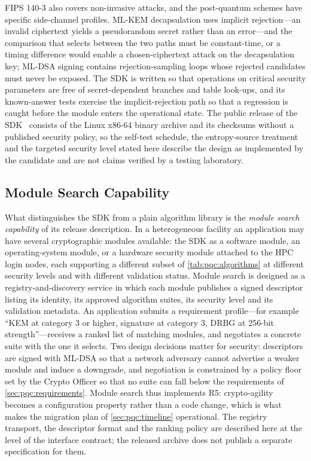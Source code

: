 FIPS 140-3 also covers non-invasive attacks, and the post-quantum schemes have specific side-channel profiles. ML-KEM decapsulation uses implicit rejection---an invalid ciphertext yields a pseudorandom secret rather than an error---and the comparison that selects between the two paths must be constant-time, or a timing difference would enable a chosen-ciphertext attack on the decapsulation key; ML-DSA signing contains rejection-sampling loops whose rejected candidates must never be exposed. The SDK is written so that operations on critical security parameters are free of secret-dependent branches and table look-ups, and its known-answer tests exercise the implicit-rejection path so that a regression is caught before the module enters the operational state. The public release of the SDK~\cite{guo2026lightriderqpc} consists of the Linux x86-64 binary archive and its checksums without a published security policy, so the self-test schedule, the entropy-source treatment and the targeted security level stated here describe the design as implemented by the candidate and are not claims verified by a testing laboratory.

\subsection{Module Search Capability}\label{sec:pqc:search}

What distinguishes the SDK from a plain algorithm library is the \emph{module search capability} of its release description. In a heterogeneous facility an application may have several cryptographic modules available: the SDK as a software module, an operating-system module, or a hardware security module attached to the HPC login nodes, each supporting a different subset of \cref{tab:pqc:algorithms} at different security levels and with different validation status. Module search is designed as a registry-and-discovery service in which each module publishes a signed descriptor listing its identity, its approved algorithm suites, its security level and its validation metadata. An application submits a requirement profile---for example ``KEM at category 3 or higher, signature at category 3, DRBG at 256-bit strength''---receives a ranked list of matching modules, and negotiates a concrete suite with the one it selects. Two design decisions matter for security: descriptors are signed with ML-DSA so that a network adversary cannot advertise a weaker module and induce a downgrade, and negotiation is constrained by a policy floor set by the Crypto Officer so that no suite can fall below the requirements of \cref{sec:pqc:requirements}. Module search thus implements R5: crypto-agility becomes a configuration property rather than a code change, which is what makes the migration plan of \cref{sec:pqc:timeline} operational. The registry transport, the descriptor format and the ranking policy are described here at the level of the interface contract; the released archive does not publish a separate specification for them.

